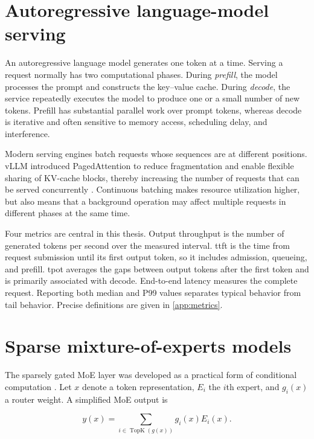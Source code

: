\label{ch:background}

\section{Autoregressive language-model serving}

An autoregressive language model generates one token at a time. Serving a
request normally has two computational phases. During \emph{prefill}, the
model processes the prompt and constructs the key--value cache. During
\emph{decode}, the service repeatedly executes the model to produce one or a
small number of new tokens. Prefill has substantial parallel work over prompt
tokens, whereas decode is iterative and often sensitive to memory access,
scheduling delay, and interference.

Modern serving engines batch requests whose sequences are at different
positions. vLLM introduced PagedAttention to reduce fragmentation and enable
flexible sharing of KV-cache blocks, thereby increasing the number of requests
that can be served concurrently \cite{kwon2023vllm}. Continuous batching makes
resource utilization higher, but also means that a background operation may
affect multiple requests in different phases at the same time.

Four metrics are central in this thesis. Output throughput is the number of
generated tokens per second over the measured interval. \gls{ttft} is the time
from request submission until its first output token, so it includes admission,
queueing, and prefill. \gls{tpot} averages the gaps between output tokens after
the first token and is primarily associated with decode. End-to-end latency
measures the complete request. Reporting both median and P99 values separates
typical behavior from tail behavior. Precise definitions are given in
\cref{app:metrics}.

\section{Sparse mixture-of-experts models}

The sparsely gated MoE layer was developed as a practical form of conditional
computation \cite{shazeer2017moe}. Let $x$ denote a token representation,
$E_i$ the $i$th expert, and $g_i(x)$ a router weight. A simplified MoE output is

\begin{equation}
  y(x)=\sum_{i\in\operatorname{TopK}(g(x))} g_i(x) E_i(x).
\end{equation}

